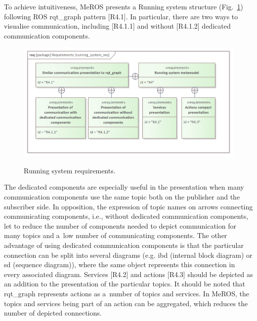 \documentclass[11pt,oneside,a4paper]{article}
\begin{document}


	
	
	To achieve intuitiveness, MeROS presents a Running system structure (Fig.~\ref{fig:running_system_req}) following ROS rqt\_graph pattern [R4.1]. In particular, there are two ways to visualise communication, including [R4.1.1] and without [R4.1.2]
	dedicated communication components.
	\begin{figure}[H]
		\centering
		\begin{center}
			{\includegraphics[scale=1.0]{img/requirement_pkg/running_system_req.png}}
		\end{center}
		\caption{Running system requirements.} 
		\label{fig:running_system_req}
	\end{figure}
	 The dedicated components are especially useful in the presentation when many communication components use the same topic both on the publisher and the subscriber side. In opposition, the expression of topic names on arrows connecting communicating components, i.e., without dedicated communication components, let to reduce the number of components needed to depict communication for many topics and a~low number of communicating components. The other advantage of using dedicated communication components is that the particular connection can be split into several diagrams (e.g. ibd (internal block diagram) or sd (sequence diagram)), where the same object represents this connection in every associated diagram. Services [R4.2] and actions [R4.3] should be depicted as an addition to the presentation of the particular topics. It should be noted that rqt\_graph represents actions as a~number of topics and services. In MeROS, the topics and services being part of an action can be aggregated, which reduces the number of depicted connections.
		
\end{document}
